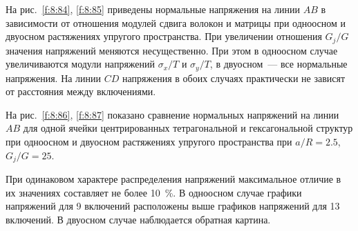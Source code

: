 На рис.~\ref{f:8:84}, \ref{f:8:85} приведены нормальные напряжения на линии $AB$ в зависимости от отношения модулей сдвига волокон и матрицы при одноосном и двуосном растяжениях упругого пространства. При увеличении отношения $G_j/G$ значения напряжений меняются несущественно. При этом в одноосном случае увеличиваются модули напряжений $\sigma_x/T$ и $\sigma_y/T$, в двуосном~--- все нормальные напряжения. На линии $CD$ напряжения в обоих случаях практически не зависят от расстояния между включениями.

На рис.~\ref{f:8:86}, \ref{f:8:87} показано сравнение нормальных напряжений на линии $AB$ для одной ячейки центрированных тетрагональной и гексагональной структур при одноосном и двуосном растяжениях упругого пространства при $a/R=2.5$, $G_j/G=25$.

При одинаковом характере распределения напряжений максимальное отличие в их значениях составляет не более 10~\%. В одноосном случае графики напряжений для 9 включений расположены выше графиков напряжений для 13 включений. В двуосном случае наблюдается обратная картина.